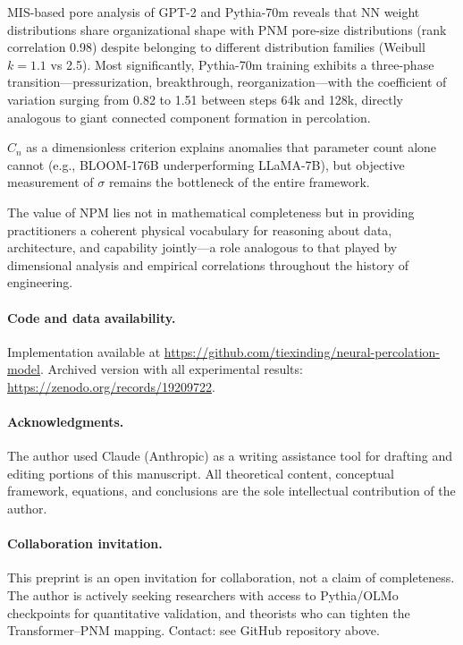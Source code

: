 \documentclass[11pt,a4paper]{article}
\begin{document}
MIS-based pore analysis of GPT-2 and Pythia-70m reveals that NN weight
distributions share organizational shape with PNM pore-size distributions
(rank correlation 0.98) despite belonging to different distribution families
(Weibull $k=1.1$ vs 2.5). Most significantly, Pythia-70m training exhibits
a three-phase transition---pressurization, breakthrough, reorganization---with
the coefficient of variation surging from 0.82 to 1.51 between steps 64k and
128k, directly analogous to giant connected component formation in percolation.

$C_n$ as a dimensionless criterion explains anomalies that parameter count
alone cannot (e.g., BLOOM-176B underperforming LLaMA-7B), but objective
measurement of $\sigma$ remains the bottleneck of the entire framework.

The value of NPM lies not in mathematical completeness but in providing
practitioners a coherent physical vocabulary for reasoning about data, architecture,
and capability jointly---a role analogous to that played by dimensional analysis
and empirical correlations throughout the history of engineering.

\paragraph{Code and data availability.}
Implementation available at \url{https://github.com/tiexinding/neural-percolation-model}.
Archived version with all experimental results: \url{https://zenodo.org/records/19209722}.

\paragraph{Acknowledgments.}
The author used Claude (Anthropic) as a writing assistance tool for drafting
and editing portions of this manuscript. All theoretical content, conceptual
framework, equations, and conclusions are the sole intellectual contribution
of the author.

\paragraph{Collaboration invitation.}
This preprint is an open invitation for collaboration, not a claim of
completeness. The author is actively seeking researchers with access to
Pythia/OLMo checkpoints for quantitative validation, and theorists who
can tighten the Transformer--PNM mapping.
Contact: see GitHub repository above.
\end{document}
